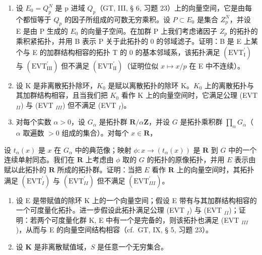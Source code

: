 \exercisegroup

\begin{enumerate}
\def\labelenumi{\arabic{enumi})}
\item
  设 \(E_{0}=Q_{p}^{N}\) 是 p 进域 \(Q_{p}\)（GT, III, § 6, 习题 23）上的向量空间，它是由每个都恒等于 \(Q_{p}\) 的因子所组成的可数无穷乘积。设 \(P\subset E_{0}\) 是集合 \(Z_{p}^{N}\)，并设 E 是由 P 生成的 \(E_{0}\) 的向量子空间。在加群 P 上我们考虑诸因子 \(Z_{p}\) 的拓扑的乘积紧拓扑，并用 B 表示 P 关于此拓扑的 0 的邻域滤子。证明：B 是 E 上某个与 E 的加群结构相容的拓扑 T 的 0 的基本邻域系，该拓扑满足 \((\mathrm{EVT}_{\mathrm{I}}^{\prime})\) 与 \((\mathrm{EVT}_{\mathrm{III}}^{\prime})\) 但不满足 \((\mathrm{EVT}_{\mathrm{II}}^{\prime})\)（证明位似 \(x\mapsto x/p\) 在 E 中不连续）。
\item
  设 K 是非离散拓扑除环，\(K_{0}\) 是赋以离散拓扑的除环 K。\(K_{0}\) 上的离散拓扑与其加群结构相容，且当我们把 \(K_{0}\) 看作 K 上的向量空间时，它满足公理 (EVT \(_{II}\)) 与 (EVT \(_{III}\)) 但不满足 (EVT \(_{I}\))。
\item
  对每个实数 \(\alpha > 0\)，设 \(G_{\alpha}\) 是拓扑群 \(\mathbf{R} / \alpha \mathbf{Z}\)，并设 \(G\) 是拓扑乘积群 \(\prod_{\alpha} G_{\alpha}\)（\(\alpha\) 取遍数 \(>0\) 组成的集合）。对每个 \(x \in \mathbf{R}\)，
\end{enumerate}

设 \(t_{\alpha}(x)\) 是 \(x\) 在 \(G_{\alpha}\) 中的典范像；映射 \(\phi : x \to (t_{\alpha}(x))\) 是 \(\mathbf{R}\) 到 \(G\) 中的一个连续单射同态。我们在 \(\mathbf{R}\) 上考虑由 \(\phi\) 取的 \(G\) 的拓扑的原像拓扑，并用 \(E\) 表示由赋以此拓扑的 \(\mathbf{R}\) 所成的拓扑群。证明：当把 \(E\) 看作 \(\mathbf{R}\) 上的向量空间时，其拓扑满足 \((\mathrm{EVT}_{I}^{\prime})\) 与 \((\mathrm{EVT}_{II}^{\prime})\) 但不满足 \((\mathrm{EVT}_{III}^{\prime})\)。

\begin{enumerate}
\def\labelenumi{\arabic{enumi})}
\setcounter{enumi}{3}
\item
  设 E 是带赋值的除环 K 上的一个向量空间；假设 E 带有与其加群结构相容的一个可度量化拓扑。进一步假设此拓扑满足公理 (EVT \(_{I}\)) 与 (EVT \(_{II}\))；证明：若两个可度量化群 K, E 中有一个是完备的，则该拓扑也满足 (EVT \(_{III}\))，从而与 E 的向量空间结构相容（cf.~GT, IX, § 5, 习题 23）。
\item
  设 \(\mathbf{K}\) 是非离散赋值域，\(S\) 是任意一个无穷集合。
\end{enumerate}


